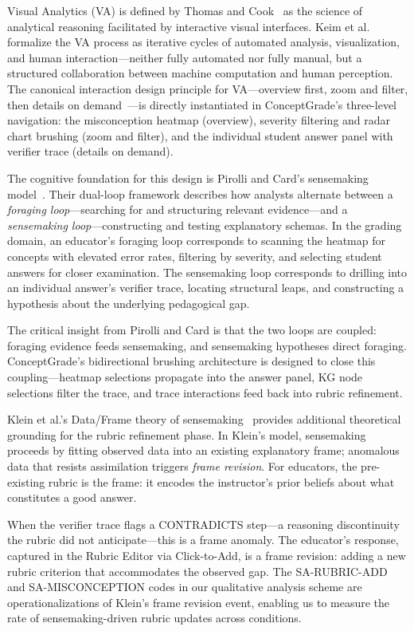 \documentclass[journal,review]{vgtc}
\begin{document}
Visual Analytics (VA) is defined by Thomas and Cook~\cite{Thomas2005} as the science of analytical reasoning facilitated by interactive visual interfaces. Keim et al.~\cite{Keim2008} formalize the VA process as iterative cycles of automated analysis, visualization, and human interaction---neither fully automated nor fully manual, but a structured collaboration between machine computation and human perception. The canonical interaction design principle for VA---overview first, zoom and filter, then details on demand~\cite{Shneiderman1996}---is directly instantiated in ConceptGrade's three-level navigation: the misconception heatmap (overview), severity filtering and radar chart brushing (zoom and filter), and the individual student answer panel with verifier trace (details on demand).

The cognitive foundation for this design is Pirolli and Card's sensemaking model~\cite{Pirolli2005}. Their dual-loop framework describes how analysts alternate between a \textit{foraging loop}---searching for and structuring relevant evidence---and a \textit{sensemaking loop}---constructing and testing explanatory schemas. In the grading domain, an educator's foraging loop corresponds to scanning the heatmap for concepts with elevated error rates, filtering by severity, and selecting student answers for closer examination. The sensemaking loop corresponds to drilling into an individual answer's verifier trace, locating structural leaps, and constructing a hypothesis about the underlying pedagogical gap.

The critical insight from Pirolli and Card is that the two loops are coupled: foraging evidence feeds sensemaking, and sensemaking hypotheses direct foraging. ConceptGrade's bidirectional brushing architecture is designed to close this coupling---heatmap selections propagate into the answer panel, KG node selections filter the trace, and trace interactions feed back into rubric refinement.

Klein et al.'s Data/Frame theory of sensemaking~\cite{Klein2007} provides additional theoretical grounding for the rubric refinement phase. In Klein's model, sensemaking proceeds by fitting observed data into an existing explanatory frame; anomalous data that resists assimilation triggers \textit{frame revision}. For educators, the pre-existing rubric is the frame: it encodes the instructor's prior beliefs about what constitutes a good answer.

When the verifier trace flags a CONTRADICTS step---a reasoning discontinuity the rubric did not anticipate---this is a frame anomaly. The educator's response, captured in the Rubric Editor via Click-to-Add, is a frame revision: adding a new rubric criterion that accommodates the observed gap. The SA-RUBRIC-ADD and SA-MISCONCEPTION codes in our qualitative analysis scheme are operationalizations of Klein's frame revision event, enabling us to measure the rate of sensemaking-driven rubric updates across conditions.
\end{document}
